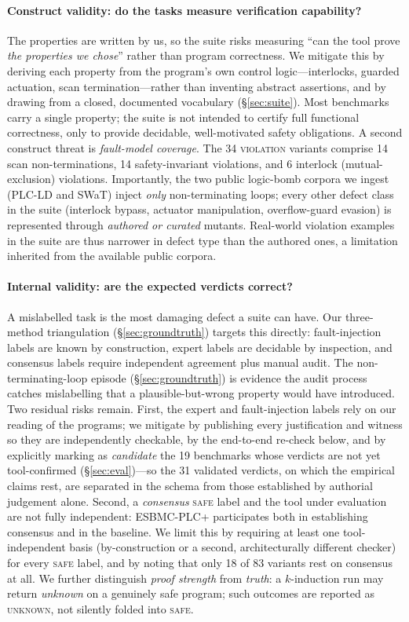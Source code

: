 \paragraph{Construct validity: do the tasks measure verification capability?}
The properties are written by us, so the suite risks measuring ``can the tool prove
\emph{the properties we chose}'' rather than program correctness. We mitigate this by
deriving each property from the program's own control logic---interlocks, guarded
actuation, scan termination---rather than inventing abstract assertions, and by drawing
from a closed, documented vocabulary (\S\ref{sec:suite}). Most benchmarks carry a single
property; the suite is not intended to certify full functional correctness, only to
provide decidable, well-motivated safety obligations. A second construct threat is
\emph{fault-model coverage}. The 34 \textsc{violation} variants comprise 14 scan
non-terminations, 14 safety-invariant violations, and 6 interlock (mutual-exclusion)
violations. Importantly, the two public logic-bomb corpora we ingest (PLC-LD and SWaT)
inject \emph{only} non-terminating loops; every other defect class in the suite
(interlock bypass, actuator manipulation, overflow-guard evasion) is represented through
\emph{authored or curated} mutants. Real-world violation examples in the suite are thus
narrower in defect type than the authored ones, a limitation inherited from the available
public corpora.

\paragraph{Internal validity: are the expected verdicts correct?}
A mislabelled task is the most damaging defect a suite can have. Our three-method
triangulation (\S\ref{sec:groundtruth}) targets this directly: fault-injection labels are
known by construction, expert labels are decidable by inspection, and consensus labels
require independent agreement plus manual audit. The non-terminating-loop episode
(\S\ref{sec:groundtruth}) is evidence the audit process catches mislabelling that a
plausible-but-wrong property would have introduced. Two residual risks remain. First,
the expert and fault-injection labels rely on our reading of the programs; we mitigate by
publishing every justification and witness so they are independently checkable, by the
end-to-end re-check below, and by explicitly marking as \emph{candidate} the 19 benchmarks
whose verdicts are not yet tool-confirmed (\S\ref{sec:eval})---so the 31 validated verdicts,
on which the empirical claims rest, are separated in the schema from those established by
authorial judgement alone. Second, a \emph{consensus} \textsc{safe} label and the
tool under evaluation are not fully independent: ESBMC-PLC+ participates both in
establishing consensus and in the baseline. We limit this by requiring at least one
tool-independent basis (by-construction or a second, architecturally different checker)
for every \textsc{safe} label, and by noting that only 18 of 83 variants rest on
consensus at all. We further distinguish \emph{proof strength} from \emph{truth}: a
$k$-induction run may return \emph{unknown} on a genuinely safe program; such outcomes are
reported as \textsc{unknown}, not silently folded into \textsc{safe}.

